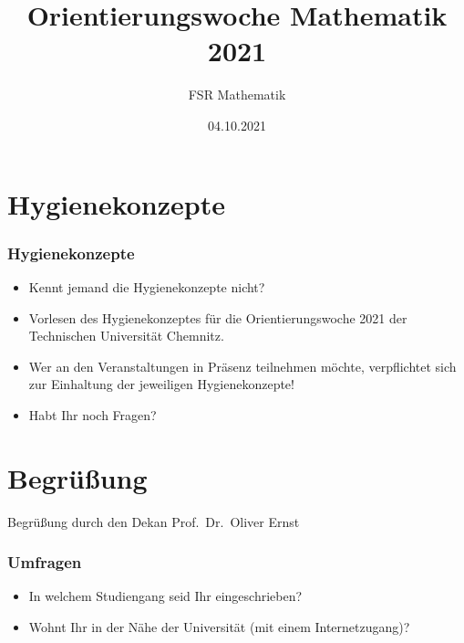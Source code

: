 \documentclass[10pt]{beamer}
\title[Orientierungswoche Mathematik 2021]{Orientierungswoche Mathematik 2021}
\author{FSR Mathematik}
\date{04.10.2021}
\institute[]{TU Chemnitz}
\makeatletter
\newcommand{\highl}[1]{\color{tuccolor@ma}#1\color{black}}
\makeatother
\begin{document}
\begingroup

\tucthreeheadlines


\endgroup

\tuctwoheadlines

\section{Hygienekonzepte}

\begin{frame}
	\frametitle{Hygienekonzepte}

	\begin{itemize}
		\item Kennt jemand die Hygienekonzepte nicht?
		\item Vorlesen des Hygienekonzeptes für die Orientierungswoche 2021 der Technischen Universität Chemnitz.
		\item Wer an den Veranstaltungen in Präsenz teilnehmen möchte, verpflichtet sich zur Einhaltung der jeweiligen Hygienekonzepte!
		\item Habt Ihr noch Fragen?
	\end{itemize}
\end{frame}


\section{Begrüßung}

\begin{frame}
	\begin{center}
		\Huge{\highl{Begrüßung durch den Dekan Prof.~Dr.~Oliver Ernst}}
	\end{center}
\end{frame}

\begin{frame}
	\frametitle{Umfragen}

	\begin{itemize}
		\item In welchem Studiengang seid Ihr eingeschrieben?
		\item Wohnt Ihr in der Nähe der Universität (mit einem Internetzugang)?
	\end{itemize}
\end{frame}
\end{document}
